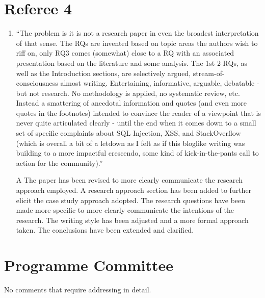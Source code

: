 \documentclass{article}
\begin{document}
\section{Referee 4}
\begin{enumerate}
\item ``The problem is it is not a research paper in even the broadest interpretation of that sense. The RQs are invented based on topic areas the authors wish to riff on, only RQ3 comes (somewhat) close to a RQ with an associated presentation based on the literature and some analysis. The 1st 2 RQs, as well as the Introduction sections, are selectively argued, stream-of-consciousness almost writing. Entertaining, informative, arguable, debatable - but not research. No methodology is applied, no systematic review, etc. Instead a smattering of anecdotal information and quotes (and even more quotes in the footnotes) intended to convince the reader of a viewpoint that is never quite articulated clearly - until the end when it comes down to a small set of specific complaints about SQL Injection, XSS, and StackOverflow (which is overall a bit of a letdown as I felt as if this bloglike writing was building to a more impactful crescendo, some kind of kick-in-the-pants call to action for the community).''
\item[A] The paper has been revised to more clearly communicate the research approach employed. A research approach section has been added to further elicit the case study approach adopted. The research questions have been made more specific to more clearly communicate the intentions of the research. The writing style has been adjusted and a more formal approach taken. The conclusions have been extended and clarified.
\end{enumerate}
\section{Programme Committee}
No comments that require addressing in detail.
\end{document}
